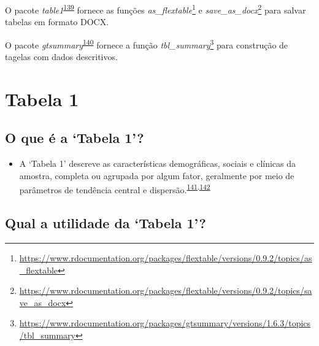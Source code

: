 \documentclass[
  a4paper,
]{book}
\providecommand{\tightlist}{%
  \setlength{\itemsep}{0pt}\setlength{\parskip}{0pt}}
\renewcommand{\href}[2]{#2\footnote{\url{#1}}}
\newenvironment{infobox}[1]
  {
  \begin{itemize}
  \renewcommand{\labelitemi}{
    \raisebox{-.7\height}[0pt][0pt]{
      {\setkeys{Gin}{width=3em,keepaspectratio}
        \texttt{[image: \#1]}}
    }
  }
  \setlength{\fboxsep}{1em}
  \begin{blackbox}
  \item
  }
  {
  \end{blackbox}
  \end{itemize}
  }
\begin{document}
\begin{infobox}{images/Rlogo}
O pacote \emph{table1}\textsuperscript{\protect\hyperlink{ref-flextable}{139}} fornece as funções \href{https://www.rdocumentation.org/packages/flextable/versions/0.9.2/topics/as_flextable}{\emph{as\_flextable}} e \href{https://www.rdocumentation.org/packages/flextable/versions/0.9.2/topics/save_as_docx}{\emph{save\_as\_docx}} para salvar tabelas em formato DOCX.

\end{infobox}

\begin{infobox}{images/Rlogo}
O pacote \emph{gtsummary}\textsuperscript{\protect\hyperlink{ref-gtsummary-2}{140}} fornece a função \href{https://www.rdocumentation.org/packages/gtsummary/versions/1.6.3/topics/tbl_summary}{\emph{tbl\_summary}} para construção de tagelas com dados descritivos.

\end{infobox}

\hypertarget{tabela-1}{%
\section{Tabela 1}\label{tabela-1}}

\hypertarget{o-que-uxe9-a-tabela-1}{%
\subsection{O que é a `Tabela 1'?}\label{o-que-uxe9-a-tabela-1}}

\begin{itemize}
\tightlist
\item
  A `Tabela 1' descreve as características demográficas, sociais e clínicas da amostra, completa ou agrupada por algum fator, geralmente por meio de parâmetros de tendência central e dispersão.\textsuperscript{\protect\hyperlink{ref-Westreich2013}{141},\protect\hyperlink{ref-chen2020}{142}}
\end{itemize}

\hypertarget{qual-a-utilidade-da-tabela-1}{%
\subsection{Qual a utilidade da `Tabela 1'?}\label{qual-a-utilidade-da-tabela-1}}
\end{document}
